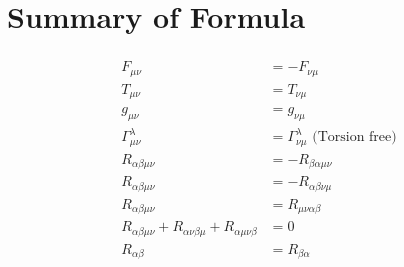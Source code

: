 \documentclass[12pt]{article}
\theoremstyle{mystyle}{\newtheorem{definition}{Definition}[subsection]}
\theoremstyle{mystyle}{\newtheorem{theorem}[definition]{Theorem}}
\theoremstyle{mystyle}{\newtheorem*{remark}{Remark}}
\theoremstyle{mystyle}{\newtheorem{example}{Example}[subsection]}
\theoremstyle{mystyle}{\newtheorem{examples}{Examples}[subsection]}
\theoremstyle{mystyle}{\newtheorem{cthm}{}[subsection]}
\begin{document}
\section{Summary of Formula}
\begin{align*}
  \begin{split}
    F_{\mu\nu} &= - F_{\nu\mu}\\
    T_{\mu\nu} &= T_{\nu\mu}\\
    g_{\mu\nu} &= g_{\nu\mu}\\
    \Gamma ^{\lambda}_{\mu\nu} &= \Gamma^{\lambda}_{\nu\mu} \text{ (Torsion free)}\\
    R_{\alpha\beta\mu\nu} &= -R_{\beta\alpha\mu\nu}\\
    R_{\alpha\beta\mu\nu} &= -R_{\alpha\beta\nu\mu}\\
    R_{\alpha\beta\mu\nu} &= R_{\mu\nu\alpha\beta}\\
    R_{\alpha\beta\mu\nu} + R_{\alpha\nu\beta\mu} + R_{\alpha\mu\nu\beta} &= 0 \\
    R_{\alpha\beta} &= R_{\beta\alpha}
  \end{split}
\end{align*}
\end{document}

